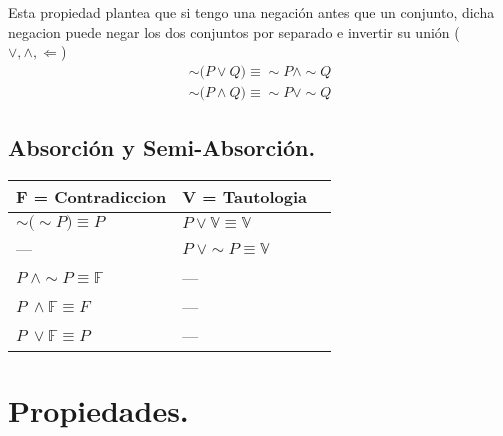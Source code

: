 \documentclass{article}
\begin{document}
\vspace{0.5cm}

 \begin{frm-thm}
 	Esta propiedad plantea que si tengo una negación antes que un conjunto, dicha negacion puede negar los dos conjuntos por separado e invertir su unión ($\vee, \land, \Leftarrow$)
 	\begin{gather*}
 		\sim\big(P \vee Q\big) \equiv \sim P \land \sim Q \\
 		\sim\big(P \land Q\big) \equiv \sim P \vee \sim Q
 	\end{gather*}
 \end{frm-thm}

\subsection*{Absorción y Semi-Absorción.}

\begin{center}
	\begin{tabular}{ | l | l  | p{5cm} |}
		\hline
		F = Contradiccion & V = Tautologia \\ \hline
		$\sim\big(\sim P\big) \equiv P$ & $P \vee \mathds{V} \equiv \mathds{V}$                                           \\ \hline
		 --- & $P \hspace{3pt}\vee \sim P \equiv \mathds{V}$  \\ \hline
		$P \hspace{3pt}\land \sim P \equiv \mathds{F}$ &---   \\ \hline
		$P \hspace{3pt}\land \mathds{F} \equiv F$ &  ---      \\ \hline
		$P \hspace{3pt}\lor \mathds{F} \equiv P$ & ---        \\
		
		\hline
	\end{tabular}
\end{center}

\pagebreak
\section{Propiedades.}

\vspace{0.9cm}
\end{document}
